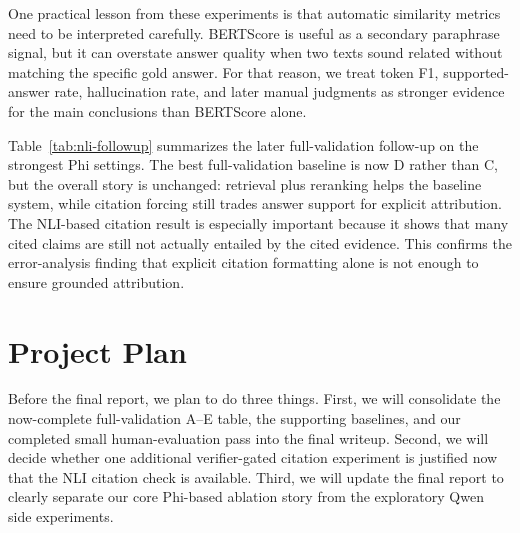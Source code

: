 \documentclass[11pt]{article}
\begin{document}
One practical lesson from these experiments is that automatic similarity metrics need to be interpreted carefully. BERTScore is useful as a secondary paraphrase signal, but it can overstate answer quality when two texts sound related without matching the specific gold answer. For that reason, we treat token F1, supported-answer rate, hallucination rate, and later manual judgments as stronger evidence for the main conclusions than BERTScore alone.

Table~\ref{tab:nli-followup} summarizes the later full-validation follow-up on the strongest Phi settings. The best full-validation baseline is now D rather than C, but the overall story is unchanged: retrieval plus reranking helps the baseline system, while citation forcing still trades answer support for explicit attribution. The NLI-based citation result is especially important because it shows that many cited claims are still not actually entailed by the cited evidence. This confirms the error-analysis finding that explicit citation formatting alone is not enough to ensure grounded attribution.

\begin{table}[H]
\centering
\small
{}
\caption{Full-validation follow-up on the strongest Phi settings. Citation-only columns are not applicable to D because baseline prompting does not produce citations.}
\label{tab:nli-followup}
\end{table}

\section{Project Plan}

Before the final report, we plan to do three things. First, we will consolidate the now-complete full-validation A--E table, the supporting baselines, and our completed small human-evaluation pass into the final writeup. Second, we will decide whether one additional verifier-gated citation experiment is justified now that the NLI citation check is available. Third, we will update the final report to clearly separate our core Phi-based ablation story from the exploratory Qwen side experiments.
\end{document}
